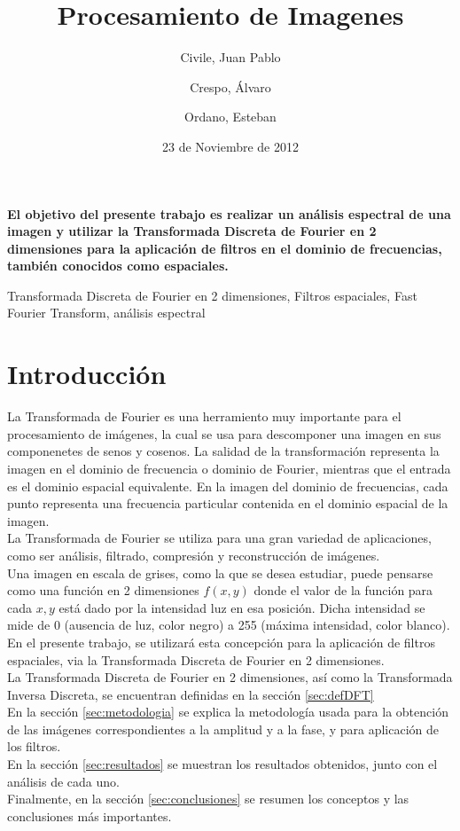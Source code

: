 \documentclass[twocolumn,a4paper,10pt]{article}
\title{Procesamiento de Imagenes}
\date{23 de Noviembre de 2012}
\author{Civile, Juan Pablo \and Crespo, Álvaro \and Ordano, Esteban }
\begin{document}
\pagestyle{fancy}
\maketitle
\thispagestyle{fancy}

\begin{customabstract}
\textbf{
El objetivo del presente trabajo es realizar un an\'alisis espectral de una imagen y utilizar la Transformada Discreta de Fourier en 2 dimensiones para 
la aplicaci\'on de filtros en el dominio de frecuencias, también conocidos como espaciales.
}
\end{customabstract}

\begin{keywords}
Transformada Discreta de Fourier en 2 dimensiones, Filtros espaciales, Fast Fourier Transform, an\'alisis espectral
\end{keywords}

\section{Introducci\'on}

La Transformada de Fourier es una herramiento muy importante para el procesamiento de im\'agenes, la cual se usa para descomponer una imagen en sus 
componenetes de senos y cosenos. La salidad de la transformaci\'on representa la imagen en el dominio de frecuencia o dominio de Fourier, mientras 
que el entrada es el dominio espacial equivalente. En la imagen del dominio de frecuencias, cada punto representa una frecuencia particular contenida en el 
dominio espacial de la imagen. \\

La Transformada de Fourier se utiliza para una gran variedad de aplicaciones, como ser an\'alisis, filtrado, compresi\'on y reconstrucci\'on de im\'agenes. \\

Una imagen en escala de grises, como la que se desea estudiar, puede pensarse como una funci\'on en 2 dimensiones $f(x,y)$ donde el valor de la función
para cada $x,y$ está dado por la intensidad luz en esa posici\'on. Dicha intensidad se mide de 0 (ausencia de luz, color negro) a 255 (m\'axima intensidad, 
color blanco). En el presente trabajo, se utilizará esta concepci\'on para la aplicaci\'on de filtros espaciales, via la 
Transformada Discreta de Fourier en 2 dimensiones. \\

La Transformada Discreta de Fourier en 2 dimensiones, así como la Transformada Inversa Discreta, se encuentran definidas en la secci\'on 
\ref{sec:defDFT}\\
En la secci\'on \ref{sec:metodologia} se explica la metodolog\'ia usada para la obtenci\'on de las im\'agenes correspondientes a la amplitud 
y a la fase, y para aplicaci\'on de los filtros. \\
En la secci\'on \ref{sec:resultados} se muestran los resultados obtenidos, junto con el an\'alisis de cada uno. \\
Finalmente, en la secci\'on \ref{sec:conclusiones} se resumen los conceptos y las conclusiones m\'as importantes. \\
\end{document}
